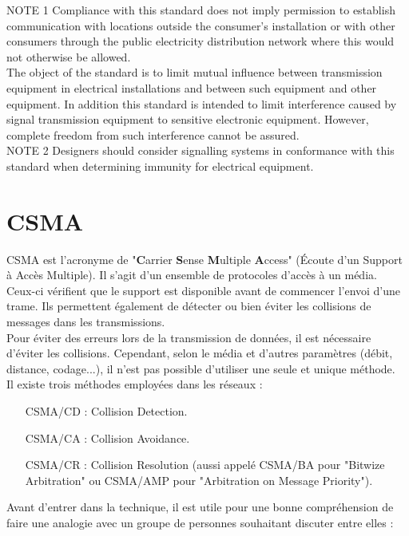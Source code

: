 \documentclass[11pt, a4paper, twoside]{book}
\begin{document}
{NOTE 1 Compliance with this standard does not imply permission to establish communication with locations outside the consumer's installation or with other consumers through the public electricity distribution network where this would not otherwise be allowed.\\

The object of the standard is to limit mutual influence between transmission equipment in electrical installations and between such equipment and other equipment. In addition this standard is intended to limit interference caused by signal transmission equipment to sensitive electronic equipment. However, complete freedom from such interference cannot be assured.\\

NOTE 2 Designers should consider signalling systems in conformance with this standard when determining immunity for electrical equipment.

\chapter{CSMA}
CSMA est l’acronyme de "\textbf{C}arrier \textbf{S}ense \textbf{M}ultiple \textbf{A}ccess" (Écoute d'un Support à Accès Multiple). Il s'agit d'un ensemble de protocoles d'accès à un média. Ceux-ci vérifient que le support est disponible avant de commencer l'envoi d'une trame. Ils permettent également de détecter ou bien éviter les collisions de messages dans les transmissions.\\

Pour éviter des erreurs lors de la transmission de données, il est nécessaire d'éviter les collisions. Cependant, selon le média et d'autres paramètres (débit, distance, codage...), il n'est pas possible d'utiliser une seule et unique méthode.\\

Il existe trois méthodes employées dans les réseaux :
\begin{itemize}
\item[CSMA/CD] : Collision Detection.
\item[CSMA/CA] : Collision Avoidance.
\item[CSMA/CR] : Collision Resolution (aussi appelé CSMA/BA pour "Bitwize Arbitration" ou CSMA/AMP pour "Arbitration on Message Priority").
\end{itemize}
Avant d'entrer dans la technique, il est utile pour une bonne compréhension de faire une analogie avec un groupe de personnes souhaitant discuter entre elles :\\

}
\end{document}
